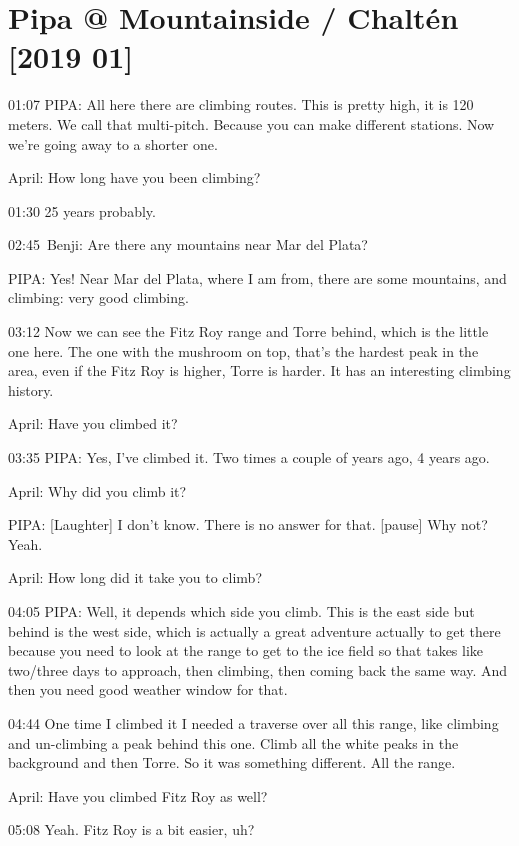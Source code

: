 \section*{Pipa @ Mountainside / Chaltén {[}2019
01{]}}\label{pipa-mountainside-chaltuxe9n-2019-01}


01:07 PIPA: All here there are climbing routes. This is pretty high, it
is 120 meters. We call that multi-pitch. Because you can make different
stations. Now we're going away to a shorter one.~~

April: How long have you been climbing?

01:30 25 years probably.

02:45~Benji: Are there any mountains near Mar del Plata?

PIPA: Yes! Near Mar del Plata, where I am from, there are some
mountains, and climbing: very good climbing.

03:12 Now we can see the Fitz Roy range and Torre behind, which is the
little one here. The one with the mushroom on top, that's the hardest
peak in the area, even if the Fitz Roy is higher, Torre is harder. It
has an interesting climbing history.~

April: Have you climbed it?

03:35 PIPA: Yes, I've climbed it. Two times a couple of years ago, 4
years ago.

April: Why did you climb it?

PIPA: {[}Laughter{]} I don't know. There is no answer for that.
{[}pause{]} Why not? Yeah.

April: How long did it take you to climb?

04:05 PIPA: Well, it depends which side you climb. This is the east side
but behind is the west side, which is actually a great adventure
actually to get there because you need to look at the range to get to
the ice field so that takes like two/three days to approach, then
climbing, then coming back the same way. And then you need good weather
window for that.

04:44 One time I climbed it I needed a traverse over all this range,
like climbing and un-climbing a peak behind this one. Climb all the
white peaks in the background and then Torre. So it was something
different. All the range.

April: Have you climbed Fitz Roy as well?

05:08 Yeah. Fitz Roy is a bit easier, uh?

